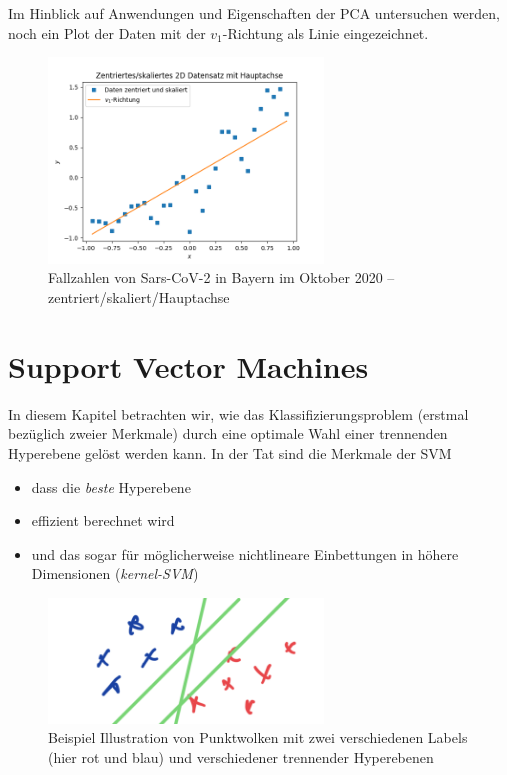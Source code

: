 \documentclass[
]{book}
\providecommand{\tightlist}{%
  \setlength{\itemsep}{0pt}\setlength{\parskip}{0pt}}
\theoremstyle{definition}
\theoremstyle{definition}
\theoremstyle{definition}
\theoremstyle{definition}
\theoremstyle{remark}
\begin{document}
Im Hinblick auf Anwendungen und Eigenschaften der PCA untersuchen werden, noch ein Plot der Daten mit der \(v_1\)-Richtung als Linie eingezeichnet.

\begin{figure}
\hypertarget{fig:cases-cntrd-HA}{%
\centering
\includegraphics[width=0.65\textwidth,height=\textheight]{bilder/07-covid-cntrd-HA.png}
\caption{Fallzahlen von Sars-CoV-2 in Bayern im Oktober
2020 -- zentriert/skaliert/Hauptachse}\label{fig:cases-cntrd-HA}
}
\end{figure}

\hypertarget{support-vector-machines}{%
\chapter{Support Vector Machines}\label{support-vector-machines}}

\newcommand\ipro[2]{\bigl \langle #1, \, #2\bigr\rangle }

In diesem Kapitel betrachten wir, wie das Klassifizierungsproblem (erstmal
bezüglich zweier Merkmale) durch eine optimale Wahl einer trennenden
Hyperebene gelöst werden kann.
In der Tat sind die Merkmale der SVM

\begin{itemize}
\tightlist
\item
  dass die \emph{beste} Hyperebene
\item
  effizient berechnet wird
\item
  und das sogar für möglicherweise nichtlineare Einbettungen in
  höhere Dimensionen (\emph{kernel-SVM})
\end{itemize}

\begin{figure}
\hypertarget{fig:cases-cntrd-HA}{%
\centering
\includegraphics[width=0.65\textwidth,height=\textheight]{bilder/08_hyperebene-punkte-bsp.png}
\caption{Beispiel Illustration von Punktwolken mit zwei verschiedenen Labels (hier rot
und blau) und verschiedener trennender Hyperebenen}\label{fig:cases-cntrd-HA}
}
\end{figure}
\end{document}
